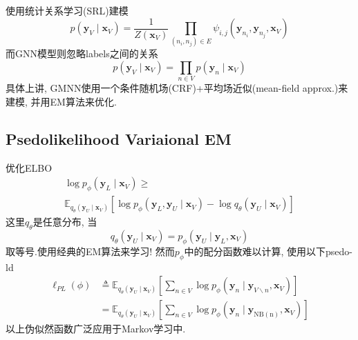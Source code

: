 \documentclass{article}
\begin{document}
     使用统计关系学习(SRL)建模
    \begin{equation}
        p\left(\mathbf{y}_{V} \mid \mathbf{x}_{V}\right)=\frac{1}{Z\left(\mathbf{x}_{V}\right)} \prod_{\left(n_{i}, n_{j}\right) \in E} \psi_{i, j}\left(\mathbf{y}_{n_{i}}, \mathbf{y}_{n_{j}}, \mathbf{x}_{V}\right)
    \end{equation}
    而GNN模型则忽略labels之间的关系
    \begin{equation}
        p\left(\mathbf{y}_{V} \mid \mathbf{x}_{V}\right)=\prod_{n \in V} p\left(\mathbf{y}_{n} \mid \mathbf{x}_{V}\right)
    \end{equation}
    具体上讲, GMNN使用一个条件随机场(CRF)+平均场近似(mean-field approx.)来建模, 并用EM算法来优化.

\subsection{Psedolikelihood Variaional EM}

    优化ELBO
    \begin{equation}
        \begin{array}{l}
        \log p_{\phi}\left(\mathbf{y}_{L} \mid \mathbf{x}_{V}\right) \geq \\
        \mathbb{E}_{q_{\theta}\left(\mathbf{y}_{U} \mid \mathbf{x}_{V}\right)}\left[\log p_{\phi}\left(\mathbf{y}_{L}, \mathbf{y}_{U} \mid \mathbf{x}_{V}\right)-\log q_{\theta}\left(\mathbf{y}_{U} \mid \mathbf{x}_{V}\right)\right]
        \end{array}
    \end{equation}
    这里$q_\theta$是任意分布, 当
    \begin{equation}
        q_{\theta}\left(\mathbf{y}_{U} \mid \mathbf{x}_{V}\right)=p_{\phi}\left(\mathbf{y}_{U} \mid \mathbf{y}_{L}, \mathbf{x}_{V}\right)
    \end{equation}
    取等号.使用经典的EM算法来学习! 然而$p_\phi$中的配分函数难以计算, 使用以下psedo-ld
    \begin{equation}
        \begin{aligned}
        \ell_{P L}(\phi) & \triangleq \mathbb{E}_{q_{\theta}\left(\mathbf{y}_{U} \mid \mathbf{x}_{V}\right)}\left[\sum_{n \in V} \log p_{\phi}\left(\mathbf{y}_{n} \mid \mathbf{y}_{V \backslash n}, \mathbf{x}_{V}\right)\right] \\
        &=\mathbb{E}_{q_{\theta}\left(\mathbf{y}_{U} \mid \mathbf{x}_{V}\right)}\left[\sum_{n \in V} \log p_{\phi}\left(\mathbf{y}_{n} \mid \mathbf{y}_{\mathrm{NB}(\mathrm{n})}, \mathbf{x}_{V}\right)\right]
        \end{aligned}
    \end{equation}
    以上伪似然函数广泛应用于Markov学习中.
\end{document}
